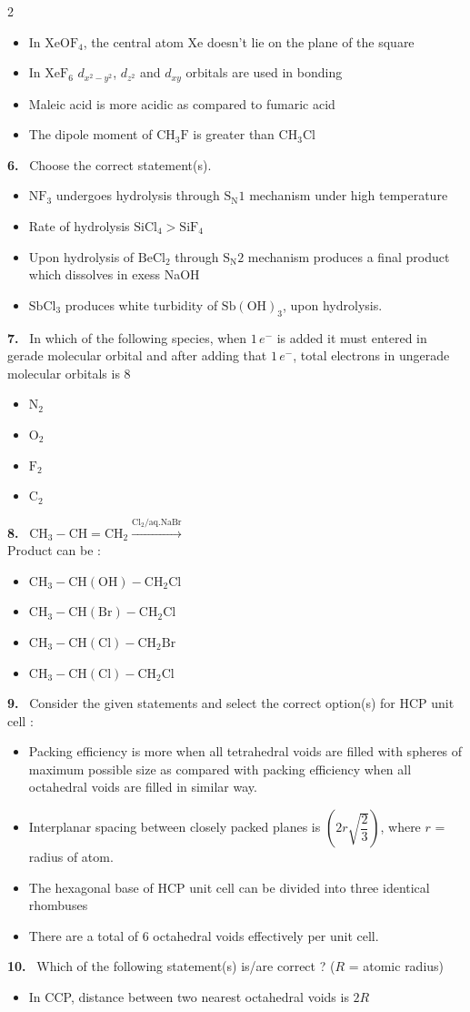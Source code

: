 \documentclass[10pt]{extarticle}
\newcommand{\qn}[1]{\par\smallskip\noindent\textbf{#1.}~}
\newenvironment{qoptions}{\begin{itemize}[leftmargin=1.8em,itemsep=1pt,topsep=2pt,label={}]}{\end{itemize}}
\newcommand{\opt}[2]{\item[(#1)] #2}
\begin{document}
\begin{multicols}{2}
\begin{qoptions}
\opt{A}{In $\mathrm{XeOF_4}$, the central atom Xe doesn't lie on the plane of the square}
\opt{B}{In $\mathrm{XeF_6}$ $d_{x^2-y^2}$, $d_{z^2}$ and $d_{xy}$ orbitals are used in bonding}
\opt{C}{Maleic acid is more acidic as compared to fumaric acid}
\opt{D}{The dipole moment of $\mathrm{CH_3F}$ is greater than $\mathrm{CH_3Cl}$}
\end{qoptions}
\qn{6} Choose the correct statement(s).
\begin{qoptions}
\opt{A}{$\mathrm{NF_3}$ undergoes hydrolysis through $\mathrm{S_N1}$ mechanism under high temperature}
\opt{B}{Rate of hydrolysis $\mathrm{SiCl_4}>\mathrm{SiF_4}$}
\opt{C}{Upon hydrolysis of $\mathrm{BeCl_2}$ through $\mathrm{S_N2}$ mechanism produces a final product which dissolves in exess NaOH}
\opt{D}{$\mathrm{SbCl_3}$ produces white turbidity of $\mathrm{Sb(OH)_3}$, upon hydrolysis.}
\end{qoptions}
\qn{7} In which of the following species, when $1\,e^-$ is added it must entered in gerade molecular orbital and after adding that $1\,e^-$, total electrons in ungerade molecular orbitals is 8
\begin{qoptions}
\opt{A}{$\mathrm{N_2}$}
\opt{B}{$\mathrm{O_2}$}
\opt{C}{$\mathrm{F_2}$}
\opt{D}{$\mathrm{C_2}$}
\end{qoptions}
\qn{8} $\mathrm{CH_3{-}CH{=}CH_2}\xrightarrow{\mathrm{Cl_2/aq.NaBr}}$\\
Product can be :
\begin{qoptions}
\opt{A}{$\mathrm{CH_3{-}CH(OH){-}CH_2Cl}$}
\opt{B}{$\mathrm{CH_3{-}CH(Br){-}CH_2Cl}$}
\opt{C}{$\mathrm{CH_3{-}CH(Cl){-}CH_2Br}$}
\opt{D}{$\mathrm{CH_3{-}CH(Cl){-}CH_2Cl}$}
\end{qoptions}
\qn{9} Consider the given statements and select the correct option(s) for HCP unit cell :
\begin{qoptions}
\opt{A}{Packing efficiency is more when all tetrahedral voids are filled with spheres of maximum possible size as compared with packing efficiency when all octahedral voids are filled in similar way.}
\opt{B}{Interplanar spacing between closely packed planes is $\left(2r\sqrt{\dfrac23}\right)$, where $r$ = radius of atom.}
\opt{C}{The hexagonal base of HCP unit cell can be divided into three identical rhombuses}
\opt{D}{There are a total of 6 octahedral voids effectively per unit cell.}
\end{qoptions}
\qn{10} Which of the following statement(s) is/are correct ? ($R$ = atomic radius)
\begin{qoptions}
\opt{A}{In CCP, distance between two nearest octahedral voids is $2R$}

\end{qoptions}
\end{multicols}
\end{document}
